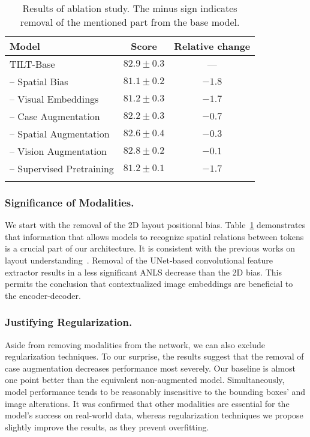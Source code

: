 \documentclass[runningheads]{llncs}
\begin{document}
\begin{table}[t]
    \caption{Results of ablation study. The minus sign indicates removal of the mentioned part from the base model. \label{tab:ablation}}
    \setlength{\tabcolsep}{7pt}
    \centering
    \begin{tabular}{lcc}
        \toprule
        Model &
        Score &
        Relative change\\

        \midrule
        TILT-Base & $82.9 \pm 0.3$ & ---  \\
        \quad -- Spatial Bias & $81.1 \pm 0.2$ & $-1.8$\\
        \quad -- Visual Embeddings& $81.2 \pm 0.3$ & $-1.7$\\
        \quad -- Case Augmentation & $82.2 \pm 0.3$ & $-0.7$\\
        \quad -- Spatial Augmentation & $82.6 \pm 0.4$ & $-0.3$\\
        \quad -- Vision Augmentation & $82.8 \pm 0.2$ & $-0.1$\\
        \quad -- Supervised Pretraining & $81.2 \pm 0.1$ & $-1.7$\\
        \bottomrule  \\
    \end{tabular}
\end{table}


\subsubsection{Significance of Modalities.} We start with the removal of the 2D layout positional bias. Table~\ref{tab:ablation} demonstrates that information that allows models to recognize spatial relations between tokens is a crucial part of our architecture. It is consistent with the previous works on layout understanding~\cite{xu2020layoutlmv2,garncarek2020lambert}. 
Removal of the UNet-based convolutional feature extractor results in a less significant ANLS decrease than the 2D bias. This permits the conclusion that contextualized image embeddings are beneficial to the encoder-decoder.

\subsubsection{Justifying Regularization.} Aside from removing modalities from the network, we can also exclude regularization techniques.
To our surprise, the results suggest that the removal of case augmentation decreases performance most severely. Our baseline is almost one point better than the equivalent non-augmented model.
Simultaneously, model performance tends to be reasonably insensitive to the bounding boxes' and image alterations.
It was confirmed that other modalities are essential for the model's success on real-world data, whereas regularization techniques we propose slightly improve the results, as they prevent overfitting.
\end{document}
